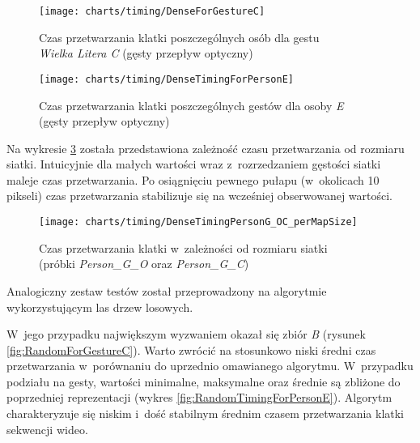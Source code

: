     \begin{figure}[!ht]
      \centering
      \texttt{[image: charts/timing/DenseForGestureC]}
      \caption[Czas przetwarzania klatki poszczególnych osób dla gestu C]
              {Czas przetwarzania klatki poszczególnych osób dla gestu \\\textit{Wielka Litera C} (gęsty przepływ optyczny)}
      \label{fig:DenseForGestureC}
    \end{figure}

    \begin{figure}[!ht]
      \centering
      \texttt{[image: charts/timing/DenseTimingForPersonE]}
      \caption[Czas przetwarzania klatki poszczególnych gestów dla osoby E]
              {Czas przetwarzania klatki poszczególnych gestów dla osoby \textit{E}\\(gęsty przepływ optyczny)}
      \label{fig:DenseTimingForPersonE}
    \end{figure}

    \newpage
    Na wykresie \ref{fig:DenseTimingPerMapSize} została przedstawiona zależność czasu przetwarzania od rozmiaru siatki. Intuicyjnie dla małych wartości wraz z~rozrzedzaniem gęstości siatki maleje czas przetwarzania. Po osiągnięciu pewnego pułapu (w~okolicach 10 pikseli) czas przetwarzania stabilizuje się na wcześniej obserwowanej wartości.

    \begin{figure}[!ht]
      \centering
      \texttt{[image: charts/timing/DenseTimingPersonG\_OC\_perMapSize]}
      \caption[Czas przetwarzania klatki w~zależności od rozmiaru siatki]
              {Czas przetwarzania klatki w~zależności od rozmiaru siatki\\(próbki \textit{Person\_G\_O} oraz \textit{Person\_G\_C})}
      \label{fig:DenseTimingPerMapSize}
    \end{figure}

    Analogiczny zestaw testów został przeprowadzony na algorytmie wykorzystującym las drzew losowych.

    W~jego przypadku największym wyzwaniem okazał się zbiór \textit{B} (rysunek \ref{fig:RandomForGestureC}). Warto zwrócić na stosunkowo niski średni czas przetwarzania w~porównaniu do uprzednio omawianego algorytmu. W~przypadku podziału na gesty, wartości minimalne, maksymalne oraz średnie są zbliżone do poprzedniej reprezentacji (wykres \ref{fig:RandomTimingForPersonE}). Algorytm charakteryzuje się niskim i~dość stabilnym średnim czasem przetwarzania klatki sekwencji wideo.

